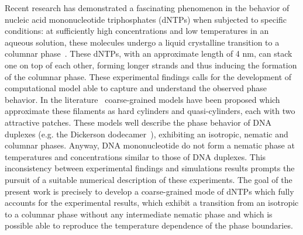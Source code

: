 \documentclass[aip,jcp, amsmath, amssymb, reprint]{revtex4-1}
\begin{document}
Recent research has demonstrated a fascinating phenomenon in the behavior of nucleic acid mononucleotide triphosphates
(dNTPs) when subjected to specific conditions: at sufficiently high concentrations and low temperatures in an aqueous
solution, these molecules undergo a liquid crystalline transition to a columnar phase~\cite{Smith}. 
These dNTPs, with an approximate length of 4 nm, can stack one on top of each other, forming longer strands and thus 
inducing the formation of the columnar phase. These experimental findings calls for 
the development of computational model able to capture and understand the observed phase behavior.
In the literature~\cite{Nguyen,C0JM02355H,Bellini} 
coarse-grained models have been proposed which approximate these filaments as hard cylinders and quasi-cylinders, each with two attractive patches. These models well describe the phase behavior of DNA duplexes (e.g. the Dickerson
dodecamer~\cite{DeMichele12}), exhibiting an isotropic, nematic and columnar phases.
Anyway, DNA mononucleotide do not form a nematic phase at temperatures and concentrations 
similar to those of DNA duplexes.
This inconsistency between experimental findings and simulations results prompts the
pursuit of a suitable numerical description of these experiments. 
The goal of the present work is precisely to develop a coarse-grained mode of dNTPs which fully accounts for the experimental 
results, which exhibit a transition from an isotropic to a columnar phase without any intermediate nematic phase and which is 
possible able to reproduce the temperature dependence of the phase boundaries.
\end{document}
